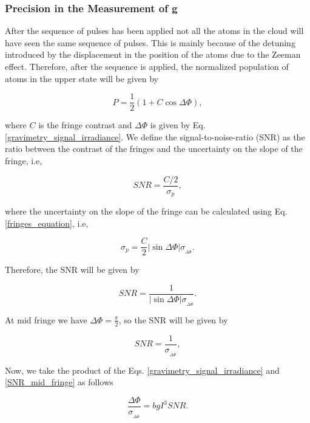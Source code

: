 \documentclass{article}
\begin{document}
\subsubsection{Precision in the Measurement of g}
After the sequence of pulses has been applied not all the atoms in the cloud will have seen the same sequence of pulses. This is mainly because of the detuning introduced by the displacement in the position of the atoms due to the Zeeman effect. Therefore, after the sequence is applied, the normalized population of atoms in the upper state will be given by

\begin{equation}\label{fringes_equation}
    P = \frac{1}{2}(1+C\cos{\Delta \Phi}),
\end{equation}

where $C$ is the fringe contrast and $\Delta \Phi$ is given by Eq. \ref{gravimetry_signal_irradiance}. We define the signal-to-noise-ratio (SNR) as the ratio between the contrast of the fringes and the uncertainty on the slope of the fringe, i.e,

\begin{equation}
    SNR = \frac{C/2}{\sigma_{p}}, 
\end{equation}

where the uncertainty on the slope of the fringe can be calculated using Eq. \ref{fringes_equation}, i.e,

\begin{equation}
    \sigma_{p} = \frac{C}{2} |\sin{\Delta \Phi}| \sigma_{_{\Delta \Phi}}.
\end{equation}

Therefore, the SNR will be given by

\begin{equation}
    SNR = \frac{1}{|\sin{\Delta \Phi}|  \sigma_{_{\Delta \Phi}}}.
\end{equation}

At mid fringe we have $\Delta \Phi = \frac{\pi}{2}$, so the SNR will be given by

\begin{equation}\label{SNR_mid_fringe}
    SNR = \frac{1}{\sigma_{_{\Delta \Phi}}},
\end{equation}

Now, we take the product of the Eqs. \ref{gravimetry_signal_irradiance} and \ref{SNR_mid_fringe} as follows

\begin{equation}\label{sensitivity_in_phase}
    \frac{\Delta \Phi}{\sigma_{_{\Delta \Phi}}} = b g I^3 SNR.
\end{equation}
\end{document}
